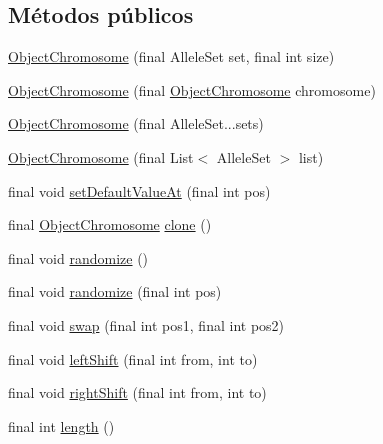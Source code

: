\subsection*{Métodos públicos}
\begin{DoxyCompactItemize}
\item 
\hyperlink{classjenes_1_1chromosome_1_1_object_chromosome_a5af7d34bc1f7260dca1dc5c38135f4a4}{Object\-Chromosome} (final Allele\-Set set, final int size)
\item 
\hyperlink{classjenes_1_1chromosome_1_1_object_chromosome_a59e25d20fb54d53ff2b4adc53177d7d2}{Object\-Chromosome} (final \hyperlink{classjenes_1_1chromosome_1_1_object_chromosome}{Object\-Chromosome} chromosome)
\item 
\hyperlink{classjenes_1_1chromosome_1_1_object_chromosome_aba090ada4d0f24caaf6f68cfed7800f0}{Object\-Chromosome} (final Allele\-Set...\-sets)
\item 
\hyperlink{classjenes_1_1chromosome_1_1_object_chromosome_aa6c8dcc77a9129f9634ea02f19d5a968}{Object\-Chromosome} (final List$<$ Allele\-Set $>$ list)
\item 
final void \hyperlink{classjenes_1_1chromosome_1_1_object_chromosome_ad4b8a3ca38d15a8170b63464149b37aa}{set\-Default\-Value\-At} (final int pos)
\item 
final \hyperlink{classjenes_1_1chromosome_1_1_object_chromosome}{Object\-Chromosome} \hyperlink{classjenes_1_1chromosome_1_1_object_chromosome_a4aa8eeaac6a20b30c260bfda00c78fe2}{clone} ()
\item 
final void \hyperlink{classjenes_1_1chromosome_1_1_object_chromosome_a26a9d9d7eb049ff88c3321728fd9de07}{randomize} ()
\item 
final void \hyperlink{classjenes_1_1chromosome_1_1_object_chromosome_aac077d08ae00b9805797d5848a10c1f4}{randomize} (final int pos)
\item 
final void \hyperlink{classjenes_1_1chromosome_1_1_object_chromosome_af85db410fecd769993c248f94396dd53}{swap} (final int pos1, final int pos2)
\item 
final void \hyperlink{classjenes_1_1chromosome_1_1_object_chromosome_a1e1570b75182f3d244a6d857a6acb7bf}{left\-Shift} (final int from, int to)
\item 
final void \hyperlink{classjenes_1_1chromosome_1_1_object_chromosome_a584d10eceb2858e0ef88ea7f7c21d83c}{right\-Shift} (final int from, int to)
\item 
final int \hyperlink{classjenes_1_1chromosome_1_1_object_chromosome_a12ff61d91455ed5915bcf71c889ea1dd}{length} ()

\end{DoxyCompactItemize}
